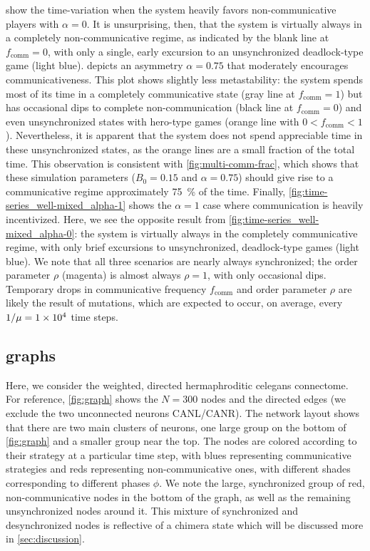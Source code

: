 \documentclass[pdflatex,lineno,referee,sn-nature]{sn-jnl}
\begin{document}
 show the time-variation
when the system heavily favors non-communicative players
with $\alpha = 0$.
It is unsurprising, then, that the system is virtually
always in a completely non-communicative regime, as indicated by the
blank line at $f_{\text{comm}} = 0$,
with only a single, early excursion to an unsynchronized
deadlock-type game (light blue).
 depicts an asymmetry $\alpha =0.75$
that moderately encourages communicativeness.
This plot shows slightly less metastability:
the system spends most of its time in a completely communicative state
(gray line at $f_{\text{comm}} = 1$)
but has occasional dips to complete non-communication
(black line at $f_{\text{comm}} = 0$)
and even unsynchronized states with hero-type games
(orange line with $0 < f_{\text{comm}} < 1$).
Nevertheless, it is apparent that the system does not spend appreciable time
in these unsynchronized states, as the orange lines are a small fraction
of the total time.
This observation is consistent with \cref{fig:multi-comm-frac},
which shows that these simulation parameters
($B_0 = 0.15$ and $\alpha = 0.75$)
should give rise to a communicative regime
approximately \SI{75}{\percent} of the time.
Finally, \cref{fig:time-series_well-mixed_alpha-1} shows the
$\alpha = 1$ case where communication is heavily incentivized.
Here, we see the opposite result from
\cref{fig:time-series_well-mixed_alpha-0}:
the system is virtually always in the completely communicative regime,
with only brief excursions to unsynchronized,
deadlock-type games (light blue).
We note that all three scenarios are nearly always synchronized;
the order parameter $\rho$ (magenta) is almost always $\rho = 1$,
with only occasional dips.
Temporary drops in communicative frequency $f_{\text{comm}}$
and order parameter $\rho$ are likely the result of mutations,
which are expected to occur, on average, every $1/\mu = \num{1E4}$ time steps.

\subsection{ graphs}
\label{sec:elegans_graph}

Here, we consider the weighted, directed hermaphroditic \gls{celegans} connectome.
For reference, \cref{fig:graph} shows the $N = 300$ nodes and the directed edges
(we exclude the two unconnected neurons CANL/CANR).
The network layout shows that there are two main clusters of neurons,
one large group on the bottom of \cref{fig:graph} and a smaller group
near the top.
The nodes are colored according to their strategy at a particular time step,
with blues representing communicative strategies
and reds representing non-communicative ones,
with different shades corresponding to different phases $\phi$.
We note the large, synchronized group
of red, non-communicative nodes in the bottom of the graph,
as well as the remaining unsynchronized nodes around it.
This mixture of synchronized and desynchronized nodes
is reflective of a chimera state which will be discussed more
in \cref{sec:discussion}.
\end{document}
